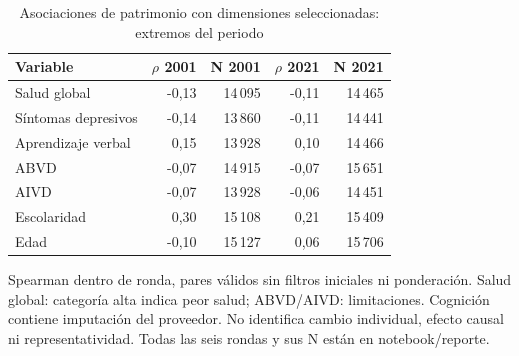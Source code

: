 \begin{table}[!htbp]
\centering
\caption{Asociaciones de patrimonio con dimensiones seleccionadas: extremos del periodo}\label{tab:integracion-asociaciones}
\small\setlength{\tabcolsep}{4pt}
\renewcommand{\arraystretch}{1.15}
\begin{tabular}{lrrrr}
\toprule
\textbf{Variable} & \textbf{$\rho$ 2001} & \textbf{N 2001} & \textbf{$\rho$ 2021} & \textbf{N 2021} \\
\midrule
Salud global & -0,13 & 14\,095 & -0,11 & 14\,465 \\
Síntomas depresivos & -0,14 & 13\,860 & -0,11 & 14\,441 \\
Aprendizaje verbal & 0,15 & 13\,928 & 0,10 & 14\,466 \\
ABVD & -0,07 & 14\,915 & -0,07 & 15\,651 \\
AIVD & -0,07 & 13\,928 & -0,06 & 14\,451 \\
Escolaridad & 0,30 & 15\,108 & 0,21 & 15\,409 \\
Edad & -0,10 & 15\,127 & 0,06 & 15\,706 \\
\bottomrule
\end{tabular}
\par\medskip
\parbox{\linewidth}{\footnotesize Spearman dentro de ronda, pares válidos sin filtros iniciales ni ponderación. Salud global: categoría alta indica peor salud; ABVD/AIVD: limitaciones. Cognición contiene imputación del proveedor. No identifica cambio individual, efecto causal ni representatividad. Todas las seis rondas y sus N están en notebook/reporte.}
\end{table}
